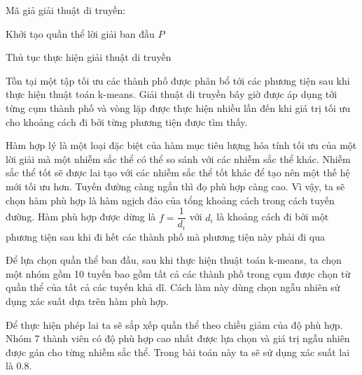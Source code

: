 \documentclass[14pt, a4paper]{article}
\numberwithin{equation}{section}
\numberwithin{figure}{section}
\numberwithin{dl}{section}
\numberwithin{md}{section}
\numberwithin{bd}{section}
\numberwithin{dn}{section}
\numberwithin{hq}{section}
\begin{document}
    Mã giả giải thuật di truyền:
    
    \begin{algorithm}[h!]
        \DontPrintSemicolon
        Khởi tạo quần thể lời giải ban đầu $P$\;
        \caption{Thủ tục thực hiện giải thuật di truyền}
    \end{algorithm}
    
    Tồn tại một tập tối ưu các thành phố được phân bổ tới các phương tiện sau khi thực hiện thuật toán k-means.
    Giải thuật di truyền bây giờ được áp dụng tới từng cụm thành phố và vòng lặp được thực hiện nhiều lần đến khi giá trị tối ưu cho khoảng cách đi bởi từng phương tiện được tìm thấy.

    Hàm hợp lý là một loại đặc biệt của hàm mục tiêu lượng hóa tính tối ưu của một lời giải mà một nhiễm sắc thể có thể so sánh với các nhiễm sắc thể khác.
    Nhiễm sắc thể tốt sẽ được lai tạo với các nhiễm sắc thể tốt khác để tạo nên một thế hệ mới tối ưu hơn.
    Tuyến đường càng ngắn thì đọ phù hợp càng cao. Vì vậy, ta sẽ chọn hàm phù hợp là hàm ngịch đảo của tổng khoảng cách trong cách tuyến đường.
    Hàm phù hợp được dừng là $f=\dfrac{1}{d_i}$ với $d_i$ là khoảng cách đi bởi một phương tiện sau khi đi hết các thành phố mà phương tiện này phải đi qua  

    Để lựa chọn quần thể ban đầu, sau khi thực hiện thuật toán k-means, ta chọn một nhóm gồm 10 tuyến bao gồm tất cả các thành phố trong cụm được chọn từ quần thể của tất cả các tuyến khả dĩ.
    Cách làm này dùng chọn ngẫu nhiên sử dụng xác suất dựa trên hàm phù hợp.

    Để thực hiện phép lai ta sẽ sắp xếp quần thể theo chiều giảm của độ phù hợp.
    Nhóm 7 thành viên có độ phù hợp cao nhất được lựa chọn và giá trị ngẫu nhiên được gán cho từng nhiễm sắc thể.
    Trong bài toán này ta sẽ sử dụng xác suất lai là 0.8.
\end{document}
